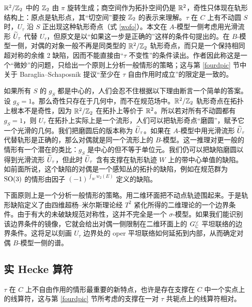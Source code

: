 \begin{yizhu}
${\mathbb R}^2/{\mathbb Z}_2$ 中的 ${\mathbb Z}_2$ 由 $\pi$ 旋转生成；商空间作为拓扑空间仍是 ${\mathbb R}^2$，奇性只体现在轨形结构上：原点是轨形点，其“切空间”要按 ${\mathbb Z}_2$ 的表示来理解。$\tau$ 在 $C$ 上有不动圆 $S$ 时，$U_\tau$ 沿 $S$ 正出现这种轨形奇点（式 \eqref{wofo}）。本文在 $A$-模型一侧考虑用光滑流形 $\widetilde U_\tau$ 代替 $U_\tau$，但原文是以“如果这一步是正确的”这样的条件句提出的。在 $B$-模型一侧，对偶的对象一般不再是同类型的 ${\mathbb R}^2/{\mathbb Z}_2$ 轨形奇点，而只是一个保持相同超对称的余维 2 缺陷，因而不能直接由“$\tau$ 不变性”的条件读出。作者因此称这是一个“微妙”的问题，只给出一个原则上分析一般情形的策略；这与第 \ref{fourdpic} 节中关于 Baraglia--Schaposnik 提议“至少在 $\tau$ 自由作用时成立”的限定是一致的。
\end{yizhu}

如果所有 $S$ 的 $g_S$ 都是中心的，人们会忍不住根据以下理由断言一个简单的答案。设 $g_S=1$。那么奇性只存在于几何中，而不在规范场中。${\mathbb R}^2/{\mathbb Z}_2$ 轨形奇点在拓扑上根本不是奇性，因为 ${\mathbb R}^2/{\mathbb Z}_2$ 在拓扑上等价于 ${\mathbb R}^2$。所以若对所有不动圆都有 $g_S=1$，则 $U_\tau$ 在拓扑上实际上是一个流形，人们可以把轨形奇点“磨圆”，赋予它一个光滑的几何。我们把磨圆后的版本称为 $\widetilde U_\tau$。如果在 $A$-模型中用光滑流形 $\widetilde U_\tau$ 代替轨形是正确的，那么对偶就是同一个流形上的 $B$-模型。这一推理对更一般的情形有一个潜在的类比：$g_S$ 是中心的但不等于单位元。我们仍可以把缺陷磨圆以得到光滑流形 $\widetilde U_\tau$，但此时 $\widetilde U_\tau$ 含有支撑在轨形轨迹 $W$ 上的带中心单值的缺陷。如前面所说，这个缺陷的对偶是一个感知丛的拓扑的缺陷，例如在规范群为 ${\mathrm{SO}}(3)$ 的情形由因子 $(-1)^{\int_W w_2(E)}$ 定义的缺陷。

下面原则上是一个分析一般情形的策略。用二维环面把不动点轨迹围起来。于是轨形缺陷定义了由四维超杨–米尔斯理论经 $T^2$ 紧化所得的二维理论的一个边界条件。由于有大的未破缺规范对称性，这并不完全是一个 $\sigma$-模型。如果我们能识别该边界条件的镜像，它就会给出对偶一侧限制在二维环面上的 $G^\vee_{\mathbb C}$ 平坦联络的边界条件。这将足以刻画 $U_\tau$ 边界处的 oper 平坦联络如何延拓到内部，从而确定对偶 $B$-模型一侧的谱。

\subsection{实 Hecke 算符}\label{rho}

$\tau$ 在 $C$ 上不自由作用的情形最重要的新特点，也许是存在支撑在 $C$ 中一个实点上的线算符，这与第 \ref{fourdpic} 节所考虑的支撑在一对 $\tau$ 共轭点上的线算符相对。

